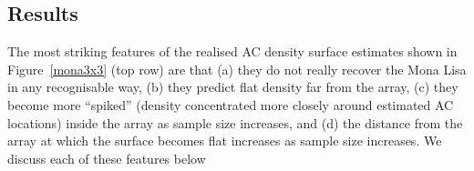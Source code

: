 \documentclass[useAMS,usenatbib,referee]{biom}
\begin{document}


\subsection{Results}
The most striking features of the realised AC density surface estimates shown in Figure~\ref{mona3x3} (top row) are that (a) they do not really recover the Mona Lisa in any recognisable way, (b) they predict flat density far from the array, (c) they become more ``spiked'' (density concentrated more closely around estimated AC locations) inside the array as sample size increases, and (d) the distance from the array at which the surface becomes flat increases as sample size increases. We discuss each of these features below
\end{document}

